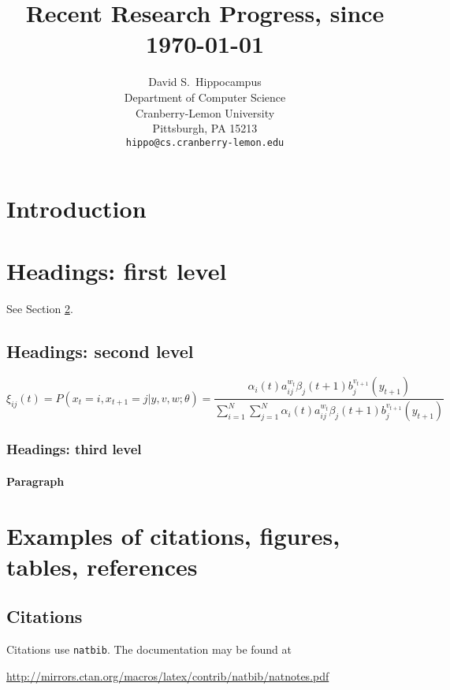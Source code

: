 \documentclass{article}
\title{Recent Research Progress, since \today}
\author{
    \hspace{1mm}David S.~Hippocampus \\
    Department of Computer Science \\
    Cranberry-Lemon University\\
    Pittsburgh, PA 15213 \\
    \texttt{hippo@cs.cranberry-lemon.edu}
}
\begin{document}
\maketitle

\begin{abstract}
    \lipsum[1]
\end{abstract}


\section{Introduction}
\lipsum[2]
\lipsum[3]


\section{Headings: first level}
\label{sec:headings}

\lipsum[4] See Section \ref{sec:headings}.

\subsection{Headings: second level}
\lipsum[5]
\begin{equation}
    \xi _{ij}(t)=P(x_{t}=i,x_{t+1}=j|y,v,w;\theta)= {\frac {\alpha _{i}(t)a^{w_t}_{ij}\beta _{j}(t+1)b^{v_{t+1}}_{j}(y_{t+1})}{\sum _{i=1}^{N} \sum _{j=1}^{N} \alpha _{i}(t)a^{w_t}_{ij}\beta _{j}(t+1)b^{v_{t+1}}_{j}(y_{t+1})}}
\end{equation}

\subsubsection{Headings: third level}
\lipsum[6]

\paragraph{Paragraph}
\lipsum[7]



\section{Examples of citations, figures, tables, references}
\label{sec:others}

\subsection{Citations}
Citations use \verb+natbib+. The documentation may be found at \cite{arjovskyWassersteinGAN2017}
\begin{center}
    \url{http://mirrors.ctan.org/macros/latex/contrib/natbib/natnotes.pdf}
\end{center}
\end{document}
